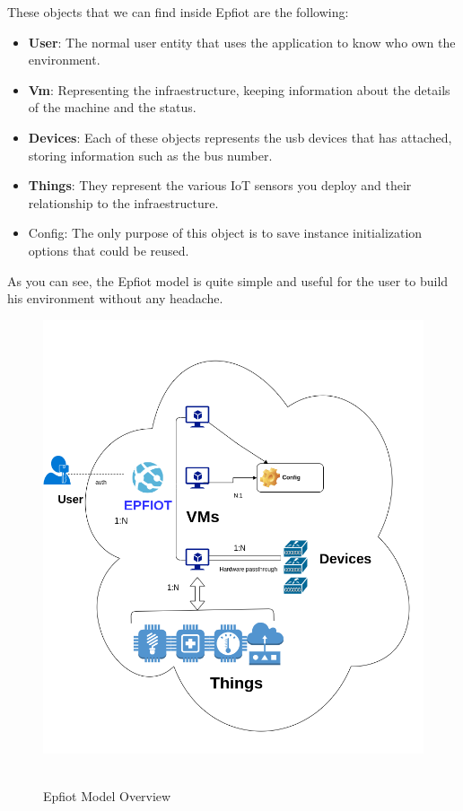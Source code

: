 These objects that we can find inside Epfiot are the following:
\begin{itemize}
    \item \textbf{User}: The normal user entity that uses the application to know who own the environment.
    \item \textbf{Vm}: Representing the infraestructure, keeping information about the details of the machine and the status.
    \item \textbf{Devices}: Each of these objects represents the usb devices that has attached, storing information such as the bus number.
    \item \textbf{Things}: They represent the various IoT sensors you deploy and their relationship to the infraestructure.
    \item Config: The only purpose of this object is to save instance initialization options that could be reused.
\end{itemize}
\newpage

As you can see, the Epfiot model is quite simple and useful for the user to build his environment without any headache.


\begin{figure}[h!]%
\centering
    \includegraphics[width=6.0in]{figures/core_model.png}
~\caption{Epfiot Model Overview}
\label{figure4.6}
\end{figure}
\newpage


